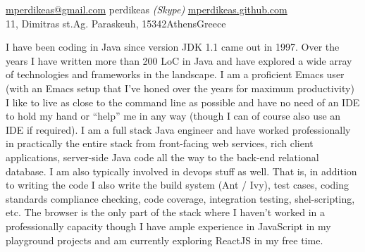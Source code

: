 \documentclass[10pt,a4paper]{article} %
\begin{document}
 



\noindent\href{mailto:mperdikeas@gmail.com}{mperdikeas@gmail.com}\bull %
perdikeas \textit{(Skype)}\bull %
\href{http://mperdikeas.github.com}{mperdikeas.github.com}\\ %
11, Dimitras st.\bull Ag. Paraskeuh, 15342\bull Athens\bull Greece %

\spacedhrule{0.9em}{-0.4em} %



\vspace{-1.3em} %

\begin{multicols}{2}  %
  \noindent
  I have been coding in Java since version JDK 1.1 came out in 1997. Over the years I have written more than 200
  LoC in Java and have explored a wide array of technologies and frameworks in the landscape. 
  I am a proficient Emacs user (with an Emacs setup that I've honed over the years for maximum productivity)
  I like to live as close to the command line as possible
  and have no need of an IDE to hold my hand or ``help'' me in any way (though I can of course also use an IDE
  if required). I am a full stack Java engineer and have worked professionally in practically the entire
  stack from front-facing web services, rich client applications, server-side Java code all the way to the back-end relational
  database. I am also typically involved in devops stuff as well. That is, in addition to writing the code I also
  write the build system (Ant / Ivy), test cases, coding standards compliance checking, code coverage,
  integration testing, shel-scripting, etc.
  The browser is the only part of the stack where I haven't worked in a professionally capacity
  though I have ample experience in JavaScript in my playground projects and am currently exploring ReactJS in my
  free time.

\end{multicols}
\end{document}
